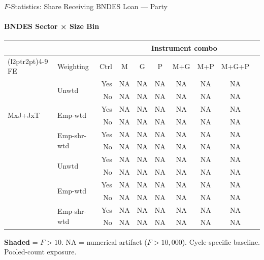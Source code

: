 \documentclass[aspectratio=169,10pt]{beamer}
\begin{document}
\begin{frame}[t]{$F$-Statistics: Share Receiving BNDES Loan --- Party}
\framesubtitle{BNDES Sector × Size Bin}
\begin{center}
\footnotesize
\setlength{\tabcolsep}{3.5pt}
\renewcommand{\arraystretch}{1.05}
\begin{tabular}{@{}llrccccccc@{}}
\toprule
 & & & \multicolumn{6}{c}{Instrument combo} \\
\cmidrule(l{2pt}r{2pt}){4-9}
FE & Weighting & Ctrl & M & G & P & M+G & M+P & M+G+P \\
\midrule
  \multirow{6}{*}{MxJ+JxT} & \multirow{2}{*}{Unwtd} & Yes & NA & NA & NA & NA & NA & NA \\
   &  & No & NA & NA & NA & NA & NA & NA \\
   & \multirow{2}{*}{Emp-wtd} & Yes & NA & NA & NA & NA & NA & NA \\
   &  & No & NA & NA & NA & NA & NA & NA \\
   & \multirow{2}{*}{Emp-shr-wtd} & Yes & NA & NA & NA & NA & NA & NA \\
   &  & No & NA & NA & NA & NA & NA & NA \\
\addlinespace[5pt]
  \multirow{6}{*}{MxJ+MxT} & \multirow{2}{*}{Unwtd} & Yes & NA & NA & NA & NA & NA & NA \\
   &  & No & NA & NA & NA & NA & NA & NA \\
   & \multirow{2}{*}{Emp-wtd} & Yes & NA & NA & NA & NA & NA & NA \\
   &  & No & NA & NA & NA & NA & NA & NA \\
   & \multirow{2}{*}{Emp-shr-wtd} & Yes & NA & NA & NA & NA & NA & NA \\
   &  & No & NA & NA & NA & NA & NA & NA \\
\bottomrule
\end{tabular}
\end{center}
{\scriptsize \colorbox{pass}{\textbf{Shaded}} = $F>10$. NA = numerical artifact ($F>10{,}000$). Cycle-specific baseline. Pooled-count exposure.}
\end{frame}
\end{document}
